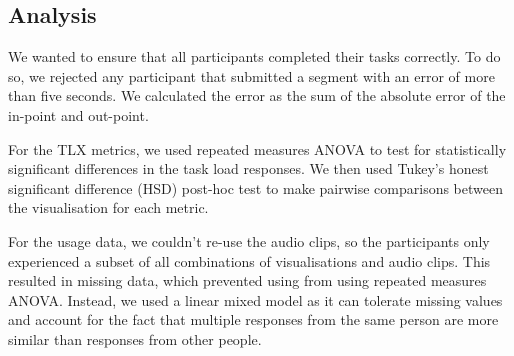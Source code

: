 
\subsection{Analysis}
We wanted to ensure that all participants completed their tasks correctly.  To do so, we rejected any participant that
submitted a segment with an error of more than five seconds. We calculated the error as the sum of the absolute error
of the in-point and out-point.


For the TLX metrics, we used repeated measures ANOVA to test for statistically significant differences in the task load
responses. We then used Tukey's honest significant difference (HSD) post-hoc test to make pairwise comparisons between
the visualisation for each metric.

For the usage data, we couldn't re-use the audio clips, so the participants only experienced a subset of all
combinations of visualisations and audio clips. This resulted in missing data, which prevented using from using
repeated measures ANOVA. Instead, we used a linear mixed model as it can tolerate missing values and account for the
fact that multiple responses from the same person are more similar than responses from other people.

